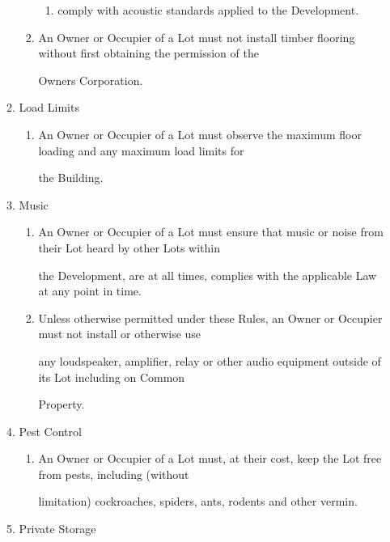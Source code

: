 \documentclass{article}
\begin{document}
\begin{enumerate}[label=\arabic*.]
\begin{enumerate}[label=\arabic{enumi}.\arabic*.]
\begin{enumerate}[label=(\arabic*)]
\begin{enumerate}[label=(\alph*)]
\item  comply with acoustic standards applied to the Development. 

\end{enumerate}
\item  An Owner or Occupier of a Lot must not install timber flooring without first obtaining the permission of the 

Owners Corporation. 

\end{enumerate}
\item  Load Limits 

\begin{enumerate}[label=(\arabic*)]
\item  An Owner or Occupier of a Lot must observe the maximum floor loading and any maximum load limits for 

the Building. 

\end{enumerate}
\item  Music 

\begin{enumerate}[label=(\arabic*)]
\item  An Owner or Occupier of a Lot must ensure that music or noise from their Lot heard by other Lots within 

the Development, are at all times, complies with the applicable Law at any point in time. 

\newpage

\item  Unless otherwise permitted under these Rules, an Owner or Occupier must not install or otherwise use 

any loudspeaker, amplifier, relay or other audio equipment outside of its Lot including on Common 

Property. 

\end{enumerate}
\item  Pest Control 

\begin{enumerate}[label=(\arabic*)]
\item  An Owner or Occupier of a Lot must, at their cost, keep the Lot free from pests, including (without 

limitation) cockroaches, spiders, ants, rodents and other vermin. 

\end{enumerate}
\item  Private Storage 


\end{enumerate}
\end{enumerate}
\end{document}
